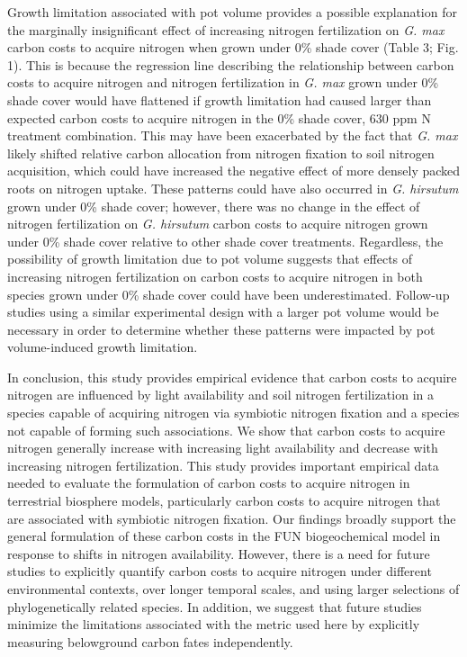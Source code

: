 Growth limitation associated with pot volume provides a possible explanation for the marginally insignificant effect of increasing nitrogen fertilization on \textit{G. max} carbon costs to acquire nitrogen when grown under 0\% shade cover (Table 3; Fig. 1). This is because the regression line describing the relationship between carbon costs to acquire nitrogen and nitrogen fertilization in \textit{G. max} grown under 0\% shade cover would have flattened if growth limitation had caused larger than expected carbon costs to acquire nitrogen in the 0\% shade cover, 630 ppm N treatment combination. This may have been exacerbated by the fact that \textit{G. max} likely shifted relative carbon allocation from nitrogen fixation to soil nitrogen acquisition, which could have increased the negative effect of more densely packed roots on nitrogen uptake. These patterns could have also occurred in \textit{G. hirsutum} grown under 0\% shade cover; however, there was no change in the effect of nitrogen fertilization on \textit{G. hirsutum} carbon costs to acquire nitrogen grown under 0\% shade cover relative to other shade cover treatments. Regardless, the possibility of growth limitation due to pot volume suggests that effects of increasing nitrogen fertilization on carbon costs to acquire nitrogen in both species grown under 0\% shade cover could have been underestimated. Follow-up studies using a similar experimental design with a larger pot volume would be necessary in order to determine whether these patterns were impacted by pot volume-induced growth limitation.

In conclusion, this study provides empirical evidence that carbon costs to acquire nitrogen are influenced by light availability and soil nitrogen fertilization in a species capable of acquiring nitrogen via symbiotic nitrogen fixation and a species not capable of forming such associations. We show that carbon costs to acquire nitrogen generally increase with increasing light availability and decrease with increasing nitrogen fertilization. This study provides important empirical data needed to evaluate the formulation of carbon costs to acquire nitrogen in terrestrial biosphere models, particularly carbon costs to acquire nitrogen that are associated with symbiotic nitrogen fixation. Our findings broadly support the general formulation of these carbon costs in the FUN biogeochemical model in response to shifts in nitrogen availability. However, there is a need for future studies to explicitly quantify carbon costs to acquire nitrogen under different environmental contexts, over longer temporal scales, and using larger selections of phylogenetically related species. In addition, we suggest that future studies minimize the limitations associated with the metric used here by explicitly measuring belowground carbon fates independently.


